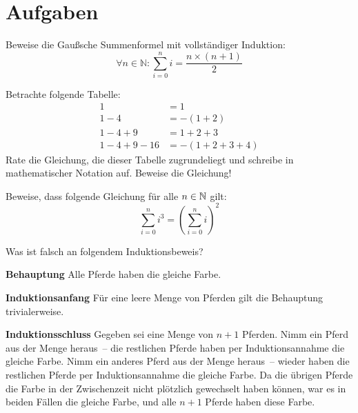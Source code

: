 \section*{Aufgaben}

\begin{aufgabe}
Beweise die Gaußsche
Summenformel mit vollständiger Induktion:
\[\forall n\in\mathbb{N}: \sum_{i=0}^n i =
  \frac{n\times(n+1)}{2}\]
\end{aufgabe}

\begin{aufgabe}
  Betrachte folgende Tabelle:
  \begin{displaymath}
    \begin{split}
    1 &= 1\\
    1-4&= -(1+2)\\
    1-4+9&= 1+2+3\\
    1-4+9-16&= -(1+2+3+4)
  \end{split}
\end{displaymath}  %
  Rate die Gleichung, die dieser Tabelle zugrundeliegt und
  schreibe in mathematischer Notation auf.  Beweise die Gleichung!
\end{aufgabe}

\begin{aufgabe}
  Beweise, dass folgende Gleichung für alle $n\in\mathbb{N}$ gilt:
  \begin{displaymath}
    \sum_{i=0}^n i^3 = \left(\sum_{i=0}^n i\right)^2
  \end{displaymath}
\end{aufgabe}

\begin{aufgabe}
  Was ist falsch an folgendem Induktionsbeweis?

  \textbf{Behauptung} Alle Pferde haben die gleiche Farbe.

  \begin{beweis}\par
    \textbf{Induktionsanfang} Für eine leere Menge von Pferden gilt die
    Behauptung trivialerweise.
    
    \textbf{Induktionsschluss} Gegeben sei eine Menge von $n+1$ Pferden.
    Nimm ein Pferd aus der Menge heraus~-- die restlichen Pferde haben per
    Induktionsannahme die gleiche Farbe.  Nimm ein anderes Pferd aus
    der Menge heraus~-- wieder haben die restlichen Pferde per
    Induktionsannahme die gleiche Farbe.  Da die übrigen Pferde die
    Farbe in der Zwischenzeit nicht plötzlich gewechselt haben können, war es in beiden Fällen
    die gleiche Farbe, und alle $n+1$ Pferde haben diese Farbe.
\end{beweis}
\end{aufgabe}

